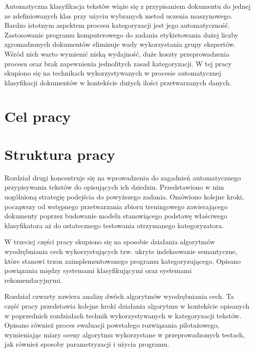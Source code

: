 \documentclass{pracamgr}
\begin{document}
Automatyczna klasyfikacja tekstów wiąże się z przypisaniem dokumentu do jednej ze zdefiniowanych klas przy użyciu wybranych metod uczenia maszynowego. Bardzo istotnym aspektem procesu kategoryzacji jest jego automatyczność. Zastosowanie programu komputerowego do zadania etykietowania dużej liczby zgromadzonych dokumentów eliminuje wady wykorzystania grupy ekspertów. Wśród nich warto wymienić niską wydajność, duże koszty przeprowadzenia procesu oraz brak zapewnienia jednolitych zasad kategoryzacji. W tej pracy skupiono się na technikach wykorzystywanych w procesie automatycznej klasyfikacji dokumentów w kontekście dużych ilości przetwarzanych danych.

\section{Cel pracy}

\section{Struktura pracy}

Rozdział drugi koncentruje się na wprowadzeniu do zagadnień automatycznego przypisywania tekstów do opisujących ich dziedzin. Przedstawiono w nim uogólnioną strategię podejścia do powyższego zadania. Omówiono kolejne kroki, począwszy od wstępnego przetwarzania zbioru treningowego zawierającego dokumenty poprzez budowanie modelu stanowiącego podstawę właściwego klasyfikatora aż do ostatecznego testowania otrzymanego kategoryzatora.

W trzeciej części pracy skupiono się na sposobie działania algorytmów wyodrębniania cech wykorzystujących tzw. ukryte indeksowanie semantyczne, które stanowi trzon zaimplementowanego programu kategoryzującego. Opisano powiązania między systemami klasyfikującymi oraz systemami rekomendacyjnymi.

Rozdział czwarty zawiera analizę dwóch algorytmów wyodrębniania cech. Ta część pracy przedstawia kolejne kroki działania algorytmu w kontekście opisanych w poprzednich rozdziałach technik wykorzystywanych w kategoryzacji tekstów. Opisano również proces ewaluacji powstałego rozwiązania pilotażowego, wymieniając miary oceny algorytmu wykorzystane w przeprowadzonych testach, jak również sposoby parametryzacji i użycia programu.
\end{document}
